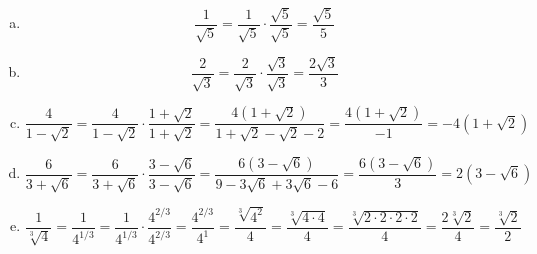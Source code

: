 \documentclass[11pt,letterpaper]{article}
\begin{document}
\sol
\begin{enumerate}[(a)]
\item 
	\[
	\dfrac{1}{\sqrt{5}}= \dfrac{1}{\sqrt{5}} \cdot \dfrac{\sqrt{5}}{\sqrt{5}}= \dfrac{\sqrt{5}}{5}
	\] \pspace

\item 
	\[
	\dfrac{2}{\sqrt{3}}= \dfrac{2}{\sqrt{3}} \cdot \dfrac{\sqrt{3}}{\sqrt{3}}= \dfrac{2\sqrt{3}}{3}
	\] \pspace

\item 
	\[
	\dfrac{4}{1 - \sqrt{2}}= \dfrac{4}{1 - \sqrt{2}} \cdot \dfrac{1 + \sqrt{2}}{1 + \sqrt{2}}= \dfrac{4(1 + \sqrt{2})}{1 + \sqrt{2} - \sqrt{2} - 2}= \dfrac{4(1 + \sqrt{2})}{-1}= -4(1 + \sqrt{2})
	\] \pspace

\item 
	\[
	\dfrac{6}{3 + \sqrt{6}}= \dfrac{6}{3 + \sqrt{6}} \cdot \dfrac{3 - \sqrt{6}}{3 - \sqrt{6}}= \dfrac{6(3 - \sqrt{6})}{9 - 3\sqrt{6} + 3\sqrt{6} - 6}= \dfrac{6(3 - \sqrt{6})}{3}= 2(3 - \sqrt{6})
	\] \pspace

\item 
	\[
	\dfrac{1}{\sqrt[3]{4}}= \dfrac{1}{4^{1/3}}= \dfrac{1}{4^{1/3}} \cdot \dfrac{4^{2/3}}{4^{2/3}}= \dfrac{4^{2/3}}{4^1}= \dfrac{\sqrt[3]{4^2}}{4}= \dfrac{\sqrt[3]{4 \cdot 4}}{4}= \dfrac{\sqrt[3]{2 \cdot 2 \cdot 2 \cdot 2}}{4}= \dfrac{2 \sqrt[3]{2}}{4}= \dfrac{\sqrt[3]{2}}{2}
	\]
\end{enumerate}
\end{document}
